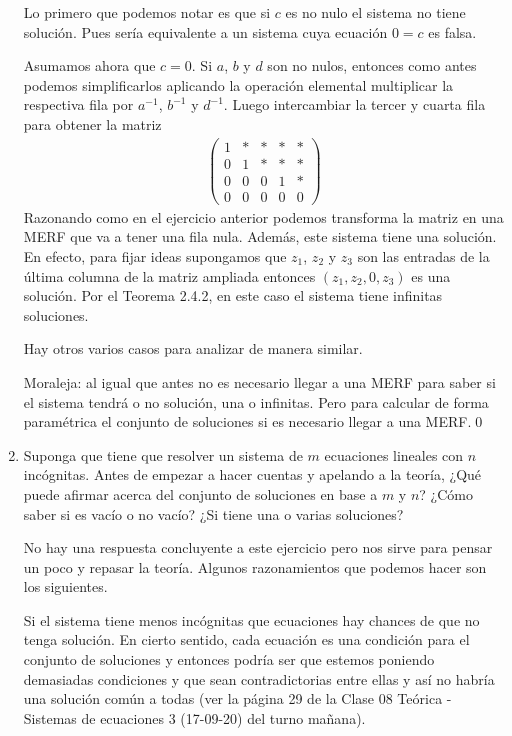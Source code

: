 \begin{enumerate}[topsep=6pt, itemsep=.4cm]
Lo primero que podemos notar es que si $c$ es no nulo el sistema no tiene solución. Pues sería equivalente a un sistema cuya ecuación $0=c$ es falsa.

Asumamos ahora que $c=0$. Si $a$, $b$ y $d$ son no nulos, entonces como antes podemos simplificarlos aplicando la operación elemental multiplicar la respectiva fila por $a^{-1}$, $b^{-1}$ y $d^{-1}$. Luego intercambiar la tercer y cuarta fila para obtener la matriz
\begin{align*}
\left(
\begin{array}{cccc|c}
1 & * & * & * & *\\
0 & 1 & * & * & *\\
0 & 0 & 0 & 1 & *\\
0 & 0 & 0 & 0 & 0
\end{array}
\right)
\end{align*}
Razonando como en el ejercicio anterior podemos transforma la matriz en una MERF que va a tener una fila nula. Además, este sistema tiene una solución. En efecto, para fijar ideas supongamos que $z_1$, $z_2$ y $z_3$ son las entradas de la última columna de la matriz ampliada entonces $(z_1,z_2,0,z_3)$ es una solución. Por el Teorema 2.4.2, en este caso el sistema tiene infinitas soluciones.

Hay otros varios casos para analizar de manera similar. 

Moraleja: al igual que antes no es necesario llegar a una MERF para saber si el sistema tendrá o no solución, una o infinitas. Pero para calcular de forma paramétrica el conjunto de soluciones si es necesario llegar a una MERF.\qed

\item Suponga que tiene que resolver un sistema de $m$ ecuaciones lineales con $n$ incógnitas. Antes de empezar a hacer cuentas y apelando a la teoría, ¿Qué puede afirmar acerca del conjunto de soluciones en base a $m$ y $n$? ¿Cómo saber si es vacío o no vacío? ¿Si tiene una o varias soluciones?
\rta

No hay una respuesta concluyente a este ejercicio pero nos sirve para pensar un poco y repasar la teoría. Algunos razonamientos que podemos hacer son los siguientes.

Si el sistema tiene menos incógnitas que ecuaciones hay chances de que no tenga solución. En cierto sentido, cada ecuación es una condición para el conjunto de soluciones y entonces podría ser que estemos poniendo demasiadas condiciones y que sean contradictorias entre ellas y así no habría una solución común a todas (ver la página 29 de la Clase 08 Teórica - Sistemas de ecuaciones 3 (17-09-20) del turno mañana).


\end{enumerate}
